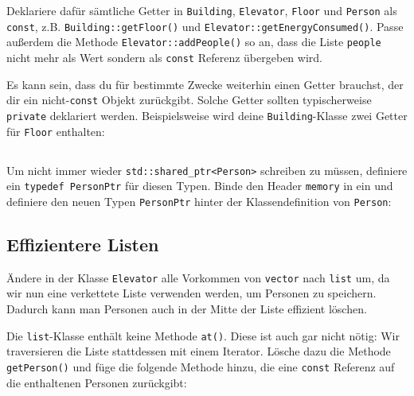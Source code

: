 Deklariere dafür sämtliche Getter in \lstinline{Building}, \lstinline{Elevator}, \lstinline{Floor} und \lstinline{Person} als \lstinline{const}, z.B. \lstinline{Building::getFloor()} und \lstinline{Elevator::getEnergyConsumed()}.
Passe außerdem die Methode \lstinline{Elevator::addPeople()} so an, dass die Liste \lstinline{people} nicht mehr als Wert sondern als \lstinline{const} Referenz übergeben wird.

Es kann sein, dass du für bestimmte Zwecke weiterhin einen Getter brauchst, der dir ein nicht-\lstinline{const} Objekt zurückgibt.
Solche Getter sollten typischerweise \lstinline{private} deklariert werden.
Beispielsweise wird deine \lstinline{Building}-Klasse zwei Getter für \lstinline{Floor} enthalten:



\subsection{}
Um nicht immer wieder \lstinline{std::shared_ptr<Person>} schreiben zu müssen, definiere ein \lstinline{typedef PersonPtr} für diesen Typen.
Binde den Header \lstinline{memory} in  ein und definiere den neuen Typen \lstinline{PersonPtr} hinter der Klassendefinition von \lstinline{Person}:



\subsection{Effizientere Listen}
Ändere in der Klasse \lstinline{Elevator} alle Vorkommen von \lstinline{vector} nach \lstinline{list} um, da wir nun eine verkettete Liste verwenden werden, um Personen zu speichern.
Dadurch kann man Personen auch in der Mitte der Liste effizient löschen.

Die \lstinline{list}-Klasse enthält keine Methode \lstinline{at()}.
Diese ist auch gar nicht nötig:
Wir traversieren die Liste stattdessen mit einem Iterator.
Lösche dazu die Methode \lstinline{getPerson()} und füge die folgende Methode hinzu, die eine \lstinline{const} Referenz auf die enthaltenen Personen zurückgibt:



